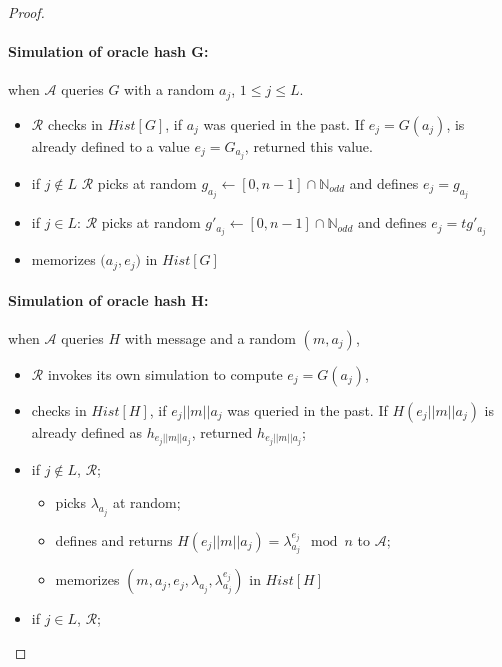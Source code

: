 \documentclass[a4paper,11pt]{article}
\begin{document}
\begin{proof}
\paragraph{Simulation of oracle hash $\mathbf{G}$:} when $\mathcal{A}$ queries $G$ with a random  $a_{j}$, $1\leq j\leq L$.

\begin{itemize}
 \item    $\mathcal{R}$ checks in $Hist [G]$, if $a_{j}$ was queried in the past. If $e_{j}=G(a_{j})$, is already defined to a value $e_{j}=G_{a_{j}}$,  returned this value.
   \item if $j \notin L$ $\mathcal{R}$ picks  at random  $ g_{a_{j}} \leftarrow [0, n-1]\cap \mathbb{N}_{odd}$ and defines $e_{j}=g_{a_{j}}$
   \item  if $j \in L$:  $\mathcal{R}$ picks  at random  $ g'_{a_{j}} \leftarrow [0, n-1]\cap \mathbb{N}_{odd}$ and defines $e_{j}=tg'_{a_{j}}$
 \item     memorizes $\big(a_{j}, e_{j}\big)$ in $Hist [G]$
\end{itemize}

\paragraph{Simulation of oracle hash $\mathbf{H}$:} when $\mathcal{A}$ queries $H$ with message and a random  $(m,a_{j})$,

\begin{itemize}
 \item    $\mathcal{R}$ invokes its own simulation to compute $e_{j}=G(a_{j})$,

 \item checks in $Hist [H]$, if $e_{j}||m||a_{j}$ was queried in the past. If $ H(e_{j}||m||a_{j})$ is already defined
   as $h_{e_{j}||m||a_{j}}$,  returned $ h_{e_{j}||m||a_{j}}$;
 \item if $j \notin L$, $\mathcal{R}$;

 \begin{itemize}
    \item picks  $\lambda_{a_{j}}$ at random;
    \item defines and returns  $H(e_{j}||m||a_{j}) = \lambda^{e_{j}}_{a_{j}} \mod n$ to $\mathcal{A}$;
    \item memorizes $(m, a_{j},  e_{j},  \lambda_{a_{j}} , \lambda^{e_{j}}_{a_{j}})$ in $Hist [H]$
  \end{itemize}

  \item  if $j \in L$,  $\mathcal{R}$;


\end{itemize}
\end{proof}
\end{document}
